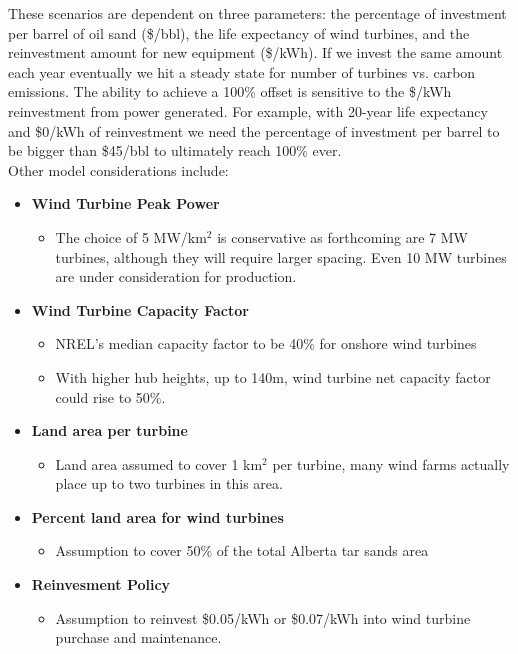 \documentclass[12pt]{article}
\begin{document}
These scenarios are dependent on three parameters: the percentage of investment per barrel of oil sand (\$/bbl), the life expectancy of wind turbines, and the reinvestment amount for new equipment (\$/kWh). If we invest the same amount each year eventually we hit a steady state for number of turbines vs. carbon emissions. The ability to achieve a 100\% offset is sensitive to the \$/kWh reinvestment from power generated. For example, with 20-year life expectancy and \$0/kWh of reinvestment we need the percentage of investment per barrel to be bigger than \$45/bbl to ultimately reach 100\% ever.  \\

Other model considerations include:

\begin{itemize}
\item {\bf Wind Turbine Peak Power}
\begin{itemize}
\item The choice of 5 MW/km$^2$ is conservative as forthcoming are 7 MW turbines, although they will require larger spacing.  Even 10 MW turbines are under consideration for production.
\end{itemize}
\item {\bf Wind Turbine Capacity Factor}
\begin{itemize}
\item NREL's median capacity factor to be 40\% for onshore wind turbines
\item With higher hub heights, up to 140m, wind turbine net capacity factor could rise to 50\%.
\end{itemize}
\item {\bf Land area per turbine}
\begin{itemize}
\item Land area assumed to cover 1 km$^2$ per turbine, many wind farms actually place up to two turbines in this area.
\end{itemize}
\item {\bf Percent land area for wind turbines}
\begin{itemize}
\item Assumption to cover 50\% of the total Alberta tar sands area
\end{itemize}
\item {\bf Reinvesment Policy}
\begin{itemize}
\item Assumption to reinvest \$0.05/kWh or \$0.07/kWh into wind turbine purchase and maintenance.
\end{itemize}
\end{itemize}
\end{document}
